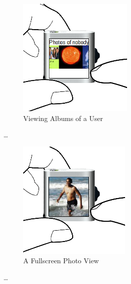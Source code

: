 \begin{figure}[h]
  \begin{center}
    \includegraphics[width=0.6\linewidth]{imgs/wt5.png}
  \end{center}
  \caption{Viewing Albums of a User}
  \label{fig:main}
\end{figure}
%
\ldots
%
\begin{figure}[h]
  \begin{center}
    \includegraphics[width=0.6\linewidth]{imgs/wt6.png}
  \end{center}
  \caption{A Fullscreen Photo View}
  \label{fig:main}
\end{figure}
%
\ldots
%
